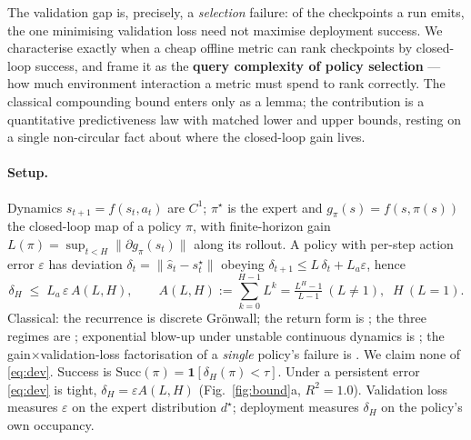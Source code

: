 
The validation gap is, precisely, a \emph{selection} failure: of the checkpoints a run emits, the one
minimising validation loss need not maximise deployment success. We characterise exactly when a cheap
offline metric can rank checkpoints by closed-loop success, and frame it as the \textbf{query
complexity of policy selection} --- how much environment interaction a metric must spend to rank
correctly. The classical compounding bound enters only as a lemma; the contribution is a quantitative
predictiveness law with matched lower and upper bounds, resting on a single non-circular fact about
where the closed-loop gain lives.

\paragraph{Setup.} Dynamics $s_{t+1}=f(s_t,a_t)$ are $C^1$; $\pi^\star$ is the expert and
$g_\pi(s)=f(s,\pi(s))$ the closed-loop map of a policy $\pi$, with finite-horizon gain
$L(\pi)=\sup_{t<H}\|\partial g_\pi(s_t)\|$ along its rollout. A policy with per-step action error
$\varepsilon$ has deviation $\delta_t=\|\hat s_t-s^\star_t\|$ obeying $\delta_{t+1}\le L\,\delta_t+L_a\varepsilon$, hence
\begin{equation}\label{eq:dev}
\delta_H \;\le\; L_a\,\varepsilon\,A(L,H),\qquad
A(L,H):=\textstyle\sum_{k=0}^{H-1}L^k=\tfrac{L^H-1}{L-1}\ (L\!\neq\!1),\;\;H\ (L{=}1).
\end{equation}
Classical: the recurrence is discrete Gr\"onwall; the return form is
\citet{ross2010efficient,ross2011reduction}; the three regimes are \citet{spencer2021feedback};
exponential blow-up under unstable continuous dynamics is \citet{simchowitz2025pitfalls}; the
gain$\times$validation-loss factorisation of a \emph{single} policy's failure is \citet{tan2026gain}.
We claim none of \eqref{eq:dev}. Success is $\mathrm{Succ}(\pi)=\mathbf 1[\delta_H(\pi)<\tau]$. Under a
persistent error \eqref{eq:dev} is tight, $\delta_H=\varepsilon A(L,H)$ (Fig.~\ref{fig:bound}a,
$R^2{=}1.0$). Validation loss measures $\varepsilon$ on the expert distribution $d^\star$; deployment
measures $\delta_H$ on the policy's own occupancy.

